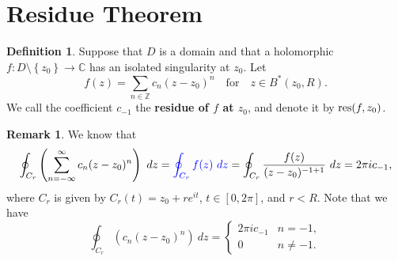 \documentclass[12pt,openany]{book}
\theoremstyle{definition}
\newtheorem{definition}{Definition}[chapter]
\newtheorem{remark}{Remark}[section]
\newcommand{\set}[1]{\left\{#1\right\}}
\newcommand{\Z}{\mathbb{Z}}
\newcommand{\C}{\mathbb{C}}
\newcommand{\of}[1]{\left( #1 \right)}
\newcommand{\res}{\textnormal{res}}
\begin{document}
	\section{Residue Theorem}
	\begin{tcolorbox}[colback=white,colframe=defcolor,arc=5pt,title={\color{white}\bf Residue}]
		\begin{definition}
			Suppose that $D$ is a domain and that a holomorphic $f:D\setminus\set{z_0}\to\C$ has an isolated singularity at $z_0$. Let \[
			f(z)=\sum_{n\in\Z}c_n(z-z_0)^n\quad\text{for}\quad z\in B^*(z_0,R).
			\] We call the coefficient $c_{-1}$ the \textbf{residue of $f$ at $z_0$}, and denote it by $\res(f,z_0)$.
		\end{definition}
	\end{tcolorbox}
	\vspace{4pt}
	\begin{remark}
		We know that \[
		\oint_{C_r}\of{\sum_{n=-\infty}^{\infty}c_n(z-z_0)^n}\ dz=\textcolor{blue}{\oint_{C_r}f(z)\ dz} = \oint_{C_r}\frac{f(z)}{(z-z_0)^{-1+1}}\ dz = 2\pi i c_{-1},
		\] where $C_r$ is given by $C_r(t)=z_0+re^{it}$, $t\in[0,2\pi]$, and $r<R$. Note that we have \[
		\oint_{C_r}\of{c_n(z-z_0)^n}\ dz=\begin{cases}
			2\pi ic_{-1} & n=-1,\\
			0 &n\neq -1.
		\end{cases}
		\]
	\end{remark}
	\vspace{4pt}
\end{document}
